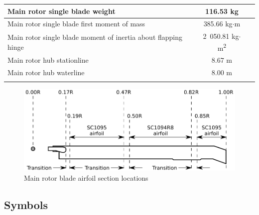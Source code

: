 \begin{tabularx}{\textwidth}{ | L | c | c | }
  Main rotor single blade weight        & 116.53 kg        & \cite{NASA-CR-166309} \\ \hline
  Main rotor single blade first moment of mass & 385.66 kg$\cdot$m & \cite{NASA-CR-166309} \\ \hline
  Main rotor single blade moment of inertia about flapping hinge & 2~050.81 kg$\cdot$m\textsuperscript{2} & \cite{NASA-CR-166309} \\ \hline
  Main rotor hub stationline            & 8.67 m           & \cite{UH60_MaintenanceManual} \\ \hline
  Main rotor hub waterline              & 8.00 m           & \cite{UH60_MaintenanceManual} \\ \hline
  \caption{Main rotor data}
\end{tabularx}

\begin{figure}[h!]
  \centering
  \includegraphics[width=120mm]{eps/uh60_blade.eps}
  \caption{Main rotor blade airfoil section locations \cite{NASA-TM-103985}}
\end{figure}


\clearpage
\subsection{Symbols}

